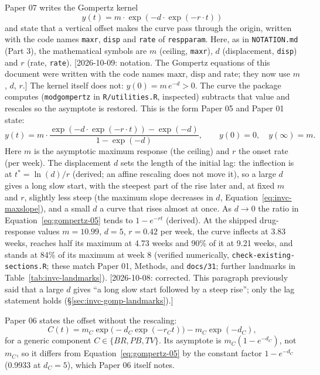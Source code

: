 \documentclass[11pt]{article}
\newcommand{\note}[1]{\textcolor{blue!60!black}{\small [#1]}}
\newcommand{\code}[1]{\texttt{#1}}
\begin{document}
Paper 07 writes the Gompertz kernel
\begin{equation}
y(t) = m \cdot \exp\!\left(-d \cdot
       \exp(-r \cdot t)\right)
\label{eq:gompertz-07}
\end{equation}
and state that a vertical offset makes the curve pass through the
origin, written with the code names \code{maxr}, \code{disp} and
\code{rate} of \code{respparam}. Here, as in \code{NOTATION.md}
(Part 3), the mathematical symbols are $m$ (ceiling, \code{maxr}), $d$
(displacement, \code{disp}) and $r$ (rate, \code{rate}).
\note{2026-10-09: notation. The Gompertz equations of this document
were written with the code names $\mathrm{maxr}$, $\mathrm{disp}$ and
$\mathrm{rate}$; they now use $m$, $d$, $r$.} The kernel itself does
not: $y(0) = m\,
e^{-d} > 0$. The curve the package computes
(\code{modgompertz} in \code{R/utilities.R}, inspected) subtracts that
value and rescales so the asymptote is restored. This is the form
Paper 05 and Paper 01 state:
\begin{equation}
y(t) = m \cdot
  \frac{\exp(-d\cdot\exp(-r\cdot t)) -
        \exp(-d)}{1 - \exp(-d)},
  \qquad y(0) = 0, \quad y(\infty) = m.
\label{eq:gompertz-05}
\end{equation}
Here $m$ is the asymptotic maximum response (the ceiling) and $r$
the onset rate (per week). The displacement $d$ sets the length of the
initial lag: the inflection is at $t^\ast = \ln(d)/r$
(derived; an affine rescaling does not move it), so a large $d$ gives
a long slow start, with the steepest part of the rise later and, at
fixed $m$ and $r$, slightly less steep (the maximum slope decreases in
$d$, Equation~\eqref{eq:invc-maxslope}), and a small $d$ a curve that
rises almost at once. As $d \to 0$ the ratio in
Equation~\eqref{eq:gompertz-05} tends to $1 - e^{-rt}$ (derived). At
the shipped drug-response values $m = 10.99$, $d = 5$, $r = 0.42$ per
week, the curve inflects at 3.83 weeks, reaches half its maximum at
4.73 weeks and 90\% of it at 9.21 weeks, and stands at 84\% of its
maximum at week 8 (verified numerically,
\code{check-existing-sections.R}; these match Paper 01, Methods, and
\code{docs/31}; further landmarks in Table~\ref{tab:invc-landmarks}).
\note{2026-10-08: corrected. This paragraph previously said that a
large $d$ gives ``a long slow start followed by a steep rise''; only
the lag statement holds (\S\ref{sec:invc-gomp-landmarks}).}

Paper 06 states the offset without the rescaling:
\begin{equation}
C(t) = m_C \exp\!\big(-d_C \exp(-r_C t)\big) - m_C \exp(-d_C),
\label{eq:gompertz-06}
\end{equation}
for a generic component $C \in \{BR, PB, TV\}$. Its asymptote is
$m_C(1 - e^{-d_C})$, not $m_C$, so it differs from
Equation~\eqref{eq:gompertz-05} by the constant factor
$1 - e^{-d_C}$ (0.9933 at $d_C = 5$), which Paper 06 itself notes.
\end{document}
